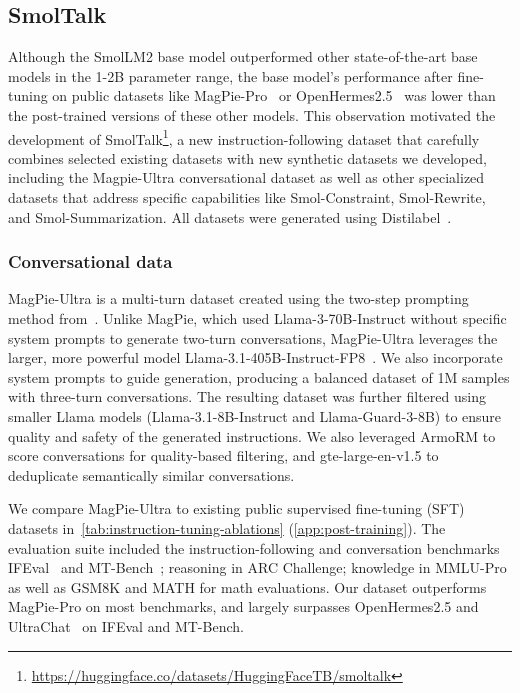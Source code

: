 \documentclass{article}
\theoremstyle{plain}
\theoremstyle{definition}
\theoremstyle{remark}
\begin{document}
\vspace{-0.1cm} 
\subsection{SmolTalk}
\vspace{-0.15cm} 
Although the SmolLM2 base model outperformed other state-of-the-art base models in the 1-2B parameter range, the base model's performance after fine-tuning on public datasets like MagPie-Pro~\cite{xu2024magpie} or OpenHermes2.5~\cite{OpenHermes2.5} was lower than the post-trained versions of these other models.
This observation motivated the development of SmolTalk\footnote{\href{https://huggingface.co/datasets/HuggingFaceTB/smoltalk}{https://huggingface.co/datasets/HuggingFaceTB/smoltalk}}, a new instruction-following dataset that carefully combines selected existing datasets with new synthetic datasets we developed, including the Magpie-Ultra conversational dataset as well as other specialized datasets that address specific capabilities like Smol-Constraint, Smol-Rewrite, and Smol-Summarization. All datasets were generated using Distilabel~\cite{distilabel-argilla-2024}.

\subsubsection{Conversational data}
MagPie-Ultra is a multi-turn dataset created using the two-step prompting method from~\cite{xu2024magpie}. Unlike MagPie, which used Llama-3-70B-Instruct without specific system prompts to generate two-turn conversations, MagPie-Ultra leverages the larger, more powerful model Llama-3.1-405B-Instruct-FP8~\cite{dubey2024llama}. We also incorporate system prompts to guide generation, producing a balanced dataset of 1M samples with three-turn conversations.
The resulting dataset was further filtered using smaller Llama models (Llama-3.1-8B-Instruct and Llama-Guard-3-8B) to ensure quality and safety of the generated instructions. We also leveraged ArmoRM \cite{ArmoRM,wang2024arithmetic} to score conversations for quality-based filtering, and gte-large-en-v1.5 \cite{zhang2024mgte,li2023towards} to deduplicate semantically similar conversations.

We compare MagPie-Ultra to existing public supervised fine-tuning (SFT) datasets in~\cref{tab:instruction-tuning-ablations} (\cref{app:post-training}). The evaluation suite included the instruction-following and conversation benchmarks IFEval~\cite{zhou2023instruction} and MT-Bench~\cite{zheng2023judging}; reasoning in ARC Challenge; knowledge in MMLU-Pro as well as GSM8K and MATH for math evaluations. Our dataset outperforms MagPie-Pro on most benchmarks, and largely surpasses OpenHermes2.5 and UltraChat~\cite{ding2023enhancing} on IFEval and MT-Bench.
\end{document}
